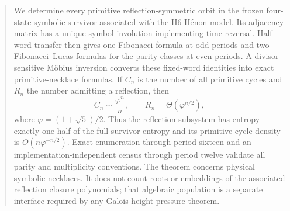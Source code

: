 \begin{abstract}
We determine every primitive reflection-symmetric orbit in the frozen
four-state symbolic survivor associated with the H6 H\'enon model.  Its
adjacency matrix has a unique symbol involution implementing time reversal.
Half-word transfer then gives one Fibonacci formula at odd periods and two
Fibonacci--Lucas formulas for the parity classes at even periods.  A
divisor-sensitive M\"obius inversion converts these fixed-word identities
into exact primitive-necklace formulas.  If $C_n$ is the number of all
primitive cycles and $R_n$ the number admitting a reflection, then
\[
 C_n\sim \frac{\varphi^n}{n},\qquad
 R_n=\Theta(\varphi^{n/2}),
\]
where $\varphi=(1+\sqrt5)/2$.  Thus the reflection subsystem has entropy
exactly one half of the full survivor entropy and its primitive-cycle density
is $O(n\varphi^{-n/2})$.  Exact enumeration through period sixteen and an
implementation-independent census through period twelve validate all parity
and multiplicity conventions.  The theorem concerns physical symbolic
necklaces.  It does not count roots or embeddings of the associated
reflection closure polynomials; that algebraic population is a separate
interface required by any Galois-height pressure theorem.
\end{abstract}
